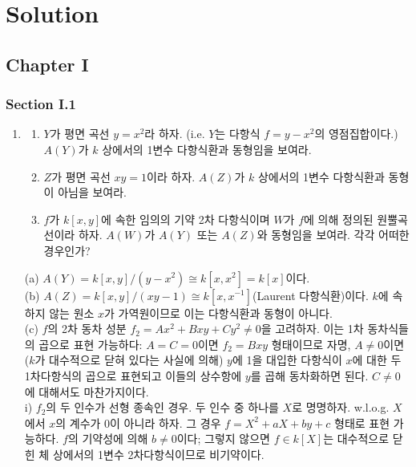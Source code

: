 	
	\chapter*{Solution}
	
	\section*{Chapter I}
	
	\subsection*{Section I.1}
	
	\begin{enumerate}[label=\tb{1.\arabic*.},itemindent=0mm,itemsep=4mm]
	\item \begin{enumerate}[label=(\alph*)]
	\item $Y$가 평면 곡선 $y=x^2$라 하자. (i.e. $Y$는 다항식 $f=y-x^2$의 영점집합이다.)
	$A(Y)$가 $k$ 상에서의 1변수 다항식환과 동형임을 보여라.
	\item $Z$가 평면 곡선 $xy=1$이라 하자. $A(Z)$가 $k$ 상에서의 1변수 다항식환과 동형이 아님을 보여라.
	\end{enumerate}
	\begin{enumerate}[label=*(\alph*)]
	\setcounter{enumii}{2}
	\item $f$가 $k[x,y]$에 속한 임의의 기약 2차 다항식이며 $W$가 $f$에 의해 정의된 원뿔곡선이라 하자.
	$A(W)$가 $A(Y)$ 또는 $A(Z)$와 동형임을 보여라. 각각 어떠한 경우인가?
	\end{enumerate}
	\sol (a) $A(Y)=k[x,y]/(y-x^2)\cong k[x,x^2]=k[x]$이다.\\
	(b) $A(Z)=k[x,y]/(xy-1)\cong k[x,x^{-1}]$(Laurent 다항식환)이다.
	$k$에 속하지 않는 원소 $x$가 가역원이므로 이는 다항식환과 동형이 아니다.\\
	(c) $f$의 2차 동차 성분 $f_2=Ax^2+Bxy+Cy^2\ne 0$을 고려하자. 이는 1차 동차식들의 곱으로 표현 가능하다:
	$A=C=0$이면 $f_2=Bxy$ 형태이므로 자명, $A\ne 0$이면 ($k$가 대수적으로 닫혀 있다는 사실에 의해) $y$에 1을 대입한 다항식이
	$x$에 대한 두 1차다항식의 곱으로 표현되고 이들의 상수항에 $y$를 곱해 동차화하면 된다. $C\ne 0$에 대해서도 마찬가지이다.\\
	i) $f_2$의 두 인수가 선형 종속인 경우. 두 인수 중 하나를 $X$로 명명하자. w.l.o.g. $X$에서 $x$의 계수가 0이 아니라 하자.
	그 경우 $f=X^2+aX+by+c$ 형태로 표현 가능하다.
	$f$의 기약성에 의해 $b\ne 0$이다; 그렇지 않으면 $f\in k[X]$는 대수적으로 닫힌 체 상에서의 1변수 2차다항식이므로 비기약이다.

\end{enumerate}

